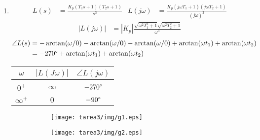 \begin{ejercicio}
\begin{enumerate}
    \item
      \begin{align*}
        L(s) &= \frac{K_p(T_1 s+1)(T_2 s +1)}{s^3}
        &
        L(j\omega) &=
          \frac
            {K_p(j\omega T_1+1)(j\omega T_2+1)}
            {(j\omega)^3}
      \end{align*}
      \begin{align*}
        \left|L(j\omega)\right| &=  |K_p|
          \frac
            {\sqrt{\omega^2 T_1^2 + 1}\sqrt{\omega^2 T_2^2 + 1}}
            {\omega^3}
      \end{align*}
      \begin{align*}
        \angle L(s) &= - \arctan(\omega/0) - \arctan(\omega/0) - \arctan(\omega/0) + \arctan(\omega t_1) + \arctan(\omega t_2)
        \\
        &= -270\degree + \arctan(\omega t_1) + \arctan(\omega t_2)
      \end{align*}

      \begin{center}
        \begin{tabular}{c | c c}
          $\omega$ & $|L(J\omega)|$ & $\angle L(j\omega)$
          \\ \hline \\
          $0^+$ & $\infty$ & $-270\degree$
          \\\\
          $\infty^+$ & $0$ & $-90\degree$
        \end{tabular}
      \end{center}

      \begin{figure}[H]
        \centering
        \begin{subfigure}{0.45\textwidth}
        \centering
          \texttt{[image: tarea3/img/g1.eps]}
        \end{subfigure}
        \begin{subfigure}{0.45\textwidth}
          \centering
          \texttt{[image: tarea3/img/g2.eps]}
        \end{subfigure}
      \end{figure}
      
  \end{enumerate}

\end{ejercicio}

